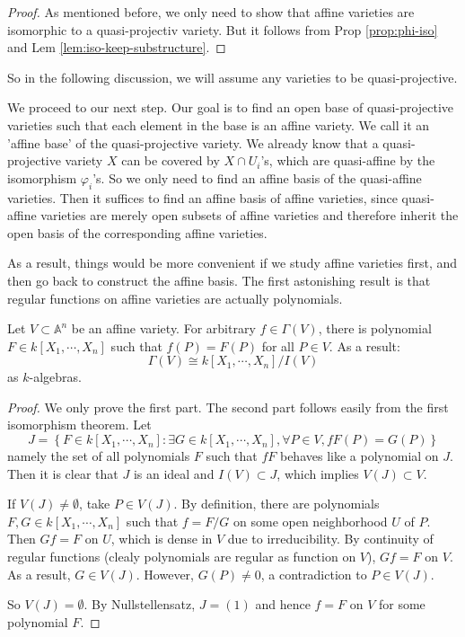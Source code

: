 \documentclass{note-eng}
\begin{document}
\begin{proof}
    As mentioned before, we only need to show that affine varieties are isomorphic to a quasi-projectiv variety. But it follows from Prop \ref{prop:phi-iso} and Lem \ref{lem:iso-keep-substructure}.
\end{proof}

So in the following discussion, we will assume any varieties to be quasi-projective.

We proceed to our next step. Our goal is to find an open base of quasi-projective varieties such that each element in the base is an affine variety. We call it an 'affine base' of the quasi-projective variety. We already know that a quasi-projective variety $X$ can be covered by $X \cap U_i$'s, which are quasi-affine by the isomorphism $\varphi_i$'s. So we only need to find an affine basis of the quasi-affine varieties. Then it suffices to find an affine basis of affine varieties, since quasi-affine varieties are merely open subsets of affine varieties and therefore inherit the open basis of the corresponding affine varieties.

As a result, things would be more convenient if we study affine varieties first, and then go back to construct the affine basis. The first astonishing result is that regular functions on affine varieties are actually polynomials.

\begin{proposition}\label{prop:affine-regular-poly}
    Let $V \subset \mathbb{A}^n$ be an affine variety. For arbitrary $f \in \Gamma(V)$, there is polynomial $F \in k[X_1, \cdots, X_n]$ such that $f(P) = F(P)$ for all $P \in V$. As a result:
    $$\Gamma(V) \cong k[X_1, \cdots, X_n] / I(V)$$
    as $k$-algebras.
\end{proposition}

\begin{proof}
    We only prove the first part. The second part follows easily from the first isomorphism theorem. Let
    $$J = \left\lbrace F \in k[X_1, \cdots, X_n]: \exists G \in k[X_1, \cdots, X_n], \forall P \in V, fF(P) = G(P) \right\rbrace$$
    namely the set of all polynomials $F$ such that $fF$ behaves like a polynomial on $J$. Then it is clear that $J$ is an ideal and $I(V) \subset J$, which implies $V(J) \subset V$.

    If $V(J) \ne \emptyset$, take $P \in V(J)$. By definition, there are polynomials $F, G \in k[X_1, \cdots, X_n]$ such that $f = F / G$ on some open neighborhood $U$ of $P$. Then $Gf = F$ on $U$, which is dense in $V$ due to irreducibility. By continuity of regular functions (clealy polynomials are regular as function on $V$), $Gf = F$ on $V$. As a result, $G \in V(J)$. However, $G(P) \ne 0$, a contradiction to $P \in V(J)$.

    So $V(J) = \emptyset$. By Nullstellensatz, $J = (1)$ and hence $f = F$ on $V$ for some polynomial $F$.
\end{proof}
\end{document}
